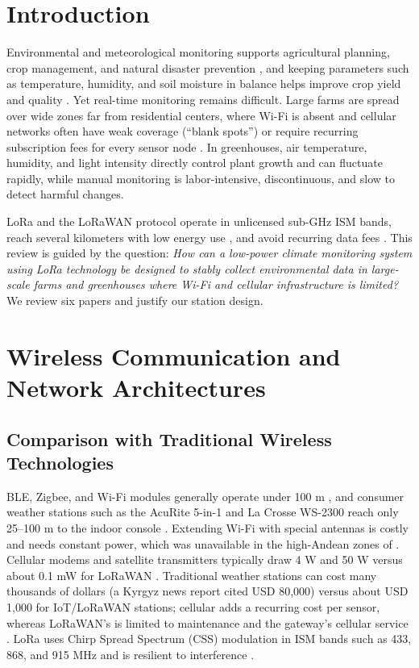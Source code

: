 \documentclass[conference]{IEEEtran}
\begin{document}
\section{Introduction}
Environmental and meteorological monitoring supports agricultural planning, crop management, and natural disaster prevention \cite{dajnowski2024, hidayat2019, zennaro2025}, and keeping parameters such as temperature, humidity, and soil moisture in balance helps improve crop yield and quality \cite{dajnowski2024, hidayat2019, lopez2025}. Yet real-time monitoring remains difficult. Large farms are spread over wide zones far from residential centers, where Wi-Fi is absent and cellular networks often have weak coverage (``blank spots'') or require recurring subscription fees for every sensor node \cite{hidayat2019, zennaro2025, lopez2025, pietrosemoli2019}. In greenhouses, air temperature, humidity, and light intensity directly control plant growth and can fluctuate rapidly, while manual monitoring is labor-intensive, discontinuous, and slow to detect harmful changes.

LoRa and the LoRaWAN protocol operate in unlicensed sub-GHz ISM bands, reach several kilometers with low energy use \cite{dajnowski2024, murdyantoro2019}, and avoid recurring data fees \cite{pietrosemoli2019}. This review is guided by the question: \textit{How can a low-power climate monitoring system using LoRa technology be designed to stably collect environmental data in large-scale farms and greenhouses where Wi-Fi and cellular infrastructure is limited?} We review six papers \cite{dajnowski2024, hidayat2019, zennaro2025, lopez2025, pietrosemoli2019, murdyantoro2019} and justify our station design.

\section{Wireless Communication and Network Architectures}

\subsection{Comparison with Traditional Wireless Technologies}
BLE, Zigbee, and Wi-Fi modules generally operate under 100 m \cite{murdyantoro2019}, and consumer weather stations such as the AcuRite 5-in-1 and La Crosse WS-2300 reach only 25--100 m to the indoor console \cite{pietrosemoli2019}. Extending Wi-Fi with special antennas is costly and needs constant power, which was unavailable in the high-Andean zones of \cite{lopez2025}. Cellular modems and satellite transmitters typically draw 4 W and 50 W versus about 0.1 mW for LoRaWAN \cite{zennaro2025}. Traditional weather stations can cost many thousands of dollars (a Kyrgyz news report cited USD 80,000) versus about USD 1,000 for IoT/LoRaWAN stations; cellular adds a recurring cost per sensor, whereas LoRaWAN's is limited to maintenance and the gateway's cellular service \cite{zennaro2025}. LoRa uses Chirp Spread Spectrum (CSS) modulation in ISM bands such as 433, 868, and 915 MHz and is resilient to interference \cite{lopez2025, murdyantoro2019}.
\end{document}
